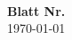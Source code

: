 \begin{titlepage}
    \begin{center}
	  \vspace*{12mm}	{\LARGE\bf \titel } \\
	  \vspace*{3mm} 	{\bf Blatt Nr.} \\
	  \vspace*{12mm}	\today \\
	  \vspace*{3mm} 	{\bf \autor} \\
	\end{center}

	\vspace*{2cm}
        \begin{spacing}{1.2}
	\end{spacing}
\end{titlepage}